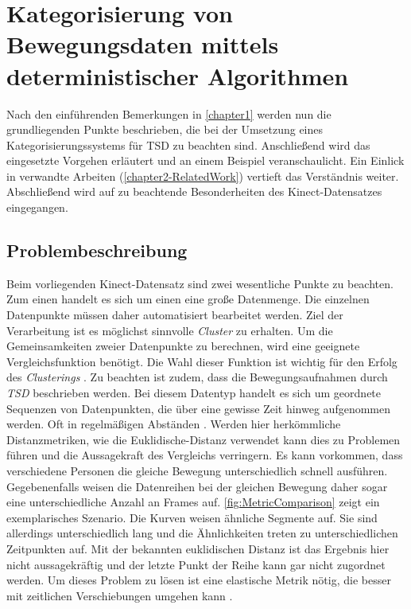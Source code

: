 \chapter{Kategorisierung von Bewegungsdaten mittels deterministischer Algorithmen}
\label{chapter2}
Nach den einführenden Bemerkungen in \autoref{chapter1} werden nun die grundliegenden Punkte beschrieben,
die bei der Umsetzung eines Kategorisierungssystems für \ac{TSD} zu beachten sind.
Anschließend wird das eingesetzte Vorgehen erläutert und an einem Beispiel veranschaulicht.
Ein Einlick in verwandte Arbeiten (\autoref{chapter2-RelatedWork}) vertieft das Verständnis weiter.
Abschließend wird auf zu beachtende Besonderheiten des Kinect-Datensatzes eingegangen.


\section{Problembeschreibung}
\label{chapter2-Problembeschreibung}
Beim vorliegenden Kinect-Datensatz sind zwei wesentliche Punkte zu beachten.
Zum einen handelt es sich um einen eine große Datenmenge.
Die einzelnen Datenpunkte müssen daher automatisiert bearbeitet werden.
Ziel der Verarbeitung ist es möglichst sinnvolle \emph{Cluster} zu erhalten.
Um die Gemeinsamkeiten zweier Datenpunkte zu berechnen,
wird eine geeignete Vergleichsfunktion benötigt.
Die Wahl dieser Funktion ist wichtig für den Erfolg des \emph{Clusterings} \citep{warren_liao_clustering_2005}.
Zu beachten ist zudem, dass die Bewegungsaufnahmen durch \emph{\ac{TSD}} beschrieben werden.
Bei diesem Datentyp handelt es sich um geordnete Sequenzen von Datenpunkten,
die über eine gewisse Zeit hinweg aufgenommen werden.
Oft in regelmäßigen Abständen \citep{ali_clustering_2019}.
Werden hier herkömmliche Distanzmetriken, wie die Euklidische-Distanz verwendet
kann dies zu Problemen führen und die Aussagekraft des Vergleichs verringern.
Es kann vorkommen, dass verschiedene Personen die gleiche Bewegung unterschiedlich schnell ausführen.
Gegebenenfalls weisen die Datenreihen bei der gleichen Bewegung daher sogar eine unterschiedliche Anzahl an Frames auf.
\autoref{fig:MetricComparison} zeigt ein exemplarisches Szenario.
Die Kurven weisen ähnliche Segmente auf.
Sie sind allerdings unterschiedlich lang und die Ähnlichkeiten treten zu unterschiedlichen Zeitpunkten auf.
Mit der bekannten euklidischen Distanz ist das Ergebnis hier nicht aussagekräftig
und der letzte Punkt der Reihe kann gar nicht zugordnet werden.
Um dieses Problem zu lösen ist eine elastische Metrik nötig,
die besser mit zeitlichen Verschiebungen umgehen kann \citep{aghabozorgi_time-series_2015}.

